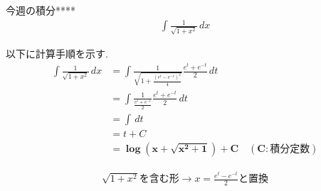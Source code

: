 \documentclass[main]{subfiles}
\begin{document}

\begin{mondai}{6}{今週の積分}{****}
    \begin{align*}
        \int \frac{1}{\sqrt{1+x^2}} \, dx
    \end{align*}
\end{mondai}


\solutionhead
\hfill
以下に計算手順を示す.
\hfill\
\begin{align*}
    \int \frac{1}{\sqrt{1+x^2}} \, dx
        &= \int \frac{1}{\sqrt{1+\frac{\left(e^t-e^{-t}\right)^2}{4}}} \frac{e^t+e^{-t}}{2} \, dt \\
        &= \int \frac{1}{\frac{e^t+e^{-t}}{2}}\frac{e^t+e^{-t}}{2} \, dt \\
        &= \int \, dt \\
        &= t+C \\
        &= \boldsymbol{\log \left(x+\sqrt{x^2+1}\right)+C \quad (C:\textbf{積分定数})}
\end{align*}

\begin{focusbox}
\centering
\vspace*{-0.9\baselineskip}
\begin{align*}
    \sqrt{1+x^2}\text{を含む形}\rightarrow x=\frac{e^t-e^{-t}}{2} \text{と置換}
\end{align*}
\end{focusbox}
\end{document}
